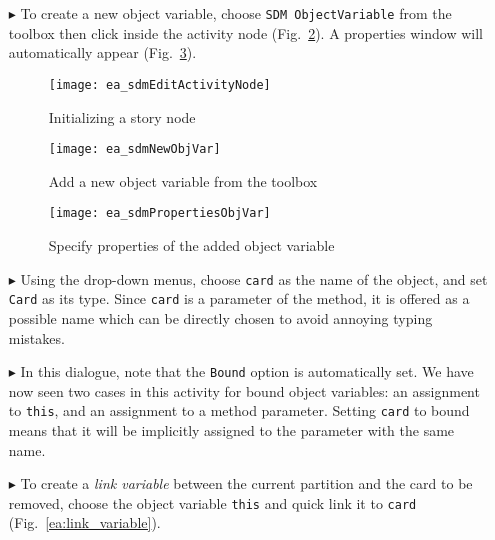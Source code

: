 \begin{itemize}
\item[$\blacktriangleright$] To create a new object variable, choose \texttt{SDM ObjectVariable} from the toolbox then click inside the activity node
(Fig.~\ref{ea:tool_box}). A properties window will automatically appear (Fig.~\ref{ea:object_variable_properties}).

\begin{figure}[htpb]
\begin{center} 
  \texttt{[image: ea\_sdmEditActivityNode]}
  \caption{Initializing a story node}  
  \label{ea:story_pattern}
\end{center}
\end{figure}

\begin{figure}[htp]
\begin{center}
  \texttt{[image: ea\_sdmNewObjVar]}
  \caption{Add a new object variable from the toolbox}  
  \label{ea:tool_box}
\end{center}
\end{figure}

\newpage

\vspace{0.5cm}

\begin{figure}[htp]
\begin{center}
  \texttt{[image: ea\_sdmPropertiesObjVar]}
  \caption{Specify properties of the added object variable}  
  \label{ea:object_variable_properties}
\end{center}
\end{figure}


\item[$\blacktriangleright$] Using the drop-down menus, choose \texttt{card} as the name of the object, and set \texttt{Card} as its type.
Since \texttt{card} is a parameter of the method, it is offered as a possible name which can be directly chosen to avoid annoying typing mistakes.

\item[$\blacktriangleright$] In this dialogue, note that the \texttt{Bound} option is automatically set. We have now seen two cases in this activity for bound
object variables: an assignment to \texttt{this}, and an assignment to a method parameter. Setting \texttt{card} to bound means that it will be implicitly
assigned to the parameter with the same name.

\item[$\blacktriangleright$] To create a \emph{link variable} between the current partition and the card to be removed, choose the object variable \texttt{this}
and quick link it to \texttt{card} (Fig.~\ref{ea:link_variable}).


\end{itemize}
